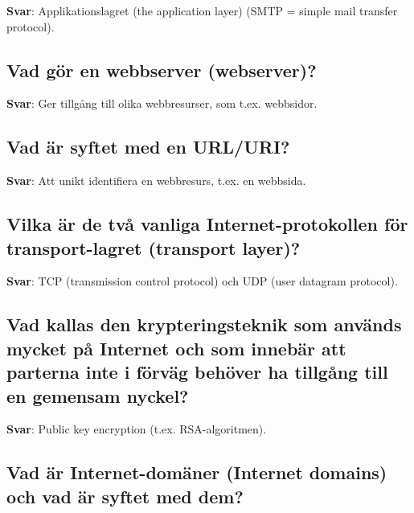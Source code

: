 \documentclass[a4paper,11pt,oneside]{article}
\begin{document}
\begin{sloppypar}
\label{q:145:sa:sv:True}

\textbf{Svar}: Applikationslagret (the application layer) (SMTP = simple mail transfer protocol).



\subsection{Vad g\"or en webbserver (webserver)?}

\label{q:146:sa:sv:True}

\textbf{Svar}: Ger tillg\r{a}ng till olika webbresurser, som t.ex. webbsidor.



\subsection{Vad \"ar syftet med en URL/URI?}

\label{q:147:sa:sv:True}

\textbf{Svar}: Att unikt identifiera en webbresurs, t.ex. en webbsida.



\subsection{Vilka \"ar de tv\r{a} vanliga Internet-protokollen f\"or transport-lagret (transport layer)?}

\label{q:148:sa:sv:True}

\textbf{Svar}: TCP (transmission control protocol) och UDP (user datagram protocol).



\subsection{Vad kallas den krypteringsteknik som anv\"ands mycket p\r{a} Internet och som inneb\"ar att parterna inte i f\"orv\"ag beh\"over ha tillg\r{a}ng till en gemensam nyckel?}

\label{q:149:sa:sv:True}

\textbf{Svar}: Public key encryption (t.ex. RSA-algoritmen).



\subsection{Vad \"ar Internet-dom\"aner (Internet domains) och vad \"ar syftet med dem?}


\end{sloppypar}
\end{document}
